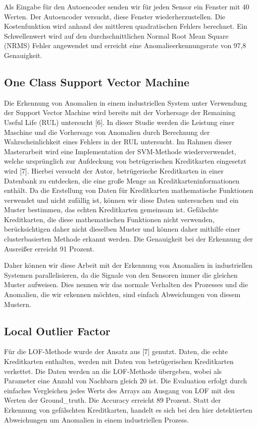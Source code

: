 \documentclass[12pt,a4paper]{scrartcl}
\numberwithin{equation}{section}
\begin{document}
Als Eingabe für den Autoencoder senden wir für jeden Sensor ein Fenster mit 40 Werten. Der Autoencoder versucht, diese Fenster wiederherzustellen. Die Kostenfunktion wird anhand des mittleren quadratischen Fehlers berechnet. Ein Schwellenwert wird auf den durchschnittlichen Normal Root Mean Square (NRMS) Fehler angewendet und erreicht eine Anomalieerkennungsrate von 97,8 Genauigkeit. 



\subsection{One Class Support Vector Machine}

Die Erkennung von Anomalien in einem industriellen System unter Verwendung der Support Vector Machine wird bereits mit der Vorhersage der Remaining Useful Life (RUL) untersucht [6]. In dieser Studie werden die Leistung einer Maschine und die Vorhersage von Anomalien durch Berechnung der Wahrscheinlichkeit eines Fehlers in der RUL untersucht. 
Im Rahmen dieser Masterarbeit wird eine Implementation der SVM-Methode wiederverwendet, welche ursprünglich zur Aufdeckung von betrügerischen Kreditkarten eingesetzt wird [7]. Hierbei versucht der Autor, betrügerische Kreditkarten in einer Datenbank zu entdecken, die eine große Menge an Kreditkarteninformationen enthält. Da die Erstellung von Daten für Kreditkarten mathematische Funktionen verwendet und nicht zufällig ist, können wir diese Daten untersuchen und ein Muster bestimmen, das echten Kreditkarten gemeinsam ist. Gefälschte Kreditkarten, die diese mathematischen Funktionen nicht verwenden, berücksichtigen daher nicht dieselben Muster und können daher mithilfe einer clusterbasierten Methode erkannt werden. Die Genauigkeit bei der Erkennung der Ausreißer erreicht 91 Prozent. 

Daher können wir diese Arbeit mit der Erkennung von Anomalien in industriellen Systemen parallelisieren, da die Signale von den Sensoren immer die gleichen Muster aufweisen. Dies nennen wir das normale Verhalten des Prozesses und die Anomalien, die wir erkennen möchten, sind einfach Abweichungen von diesem Mustern.  

\subsection{Local Outlier Factor}

Für die LOF-Methode wurde der Ansatz aus [7] genutzt. Daten, die echte Kreditkarten enthalten, werden mit Daten von betrügerischen Kreditkarten verkettet. Die Daten werden an die LOF-Methode übergeben, wobei als Parameter eine Anzahl von Nachbarn gleich 20 ist. Die Evaluation erfolgt durch einfaches Vergleichen jedes Werts des Arrays am Ausgang von LOF mit den Werten der Ground\_truth. Die Accuracy erreicht 89 Prozent. Statt der Erkennung von gefälschten Kreditkarten, handelt es sich bei den hier detektierten Abweichungen um Anomalien in einem industriellen Prozess.  
\end{document}
